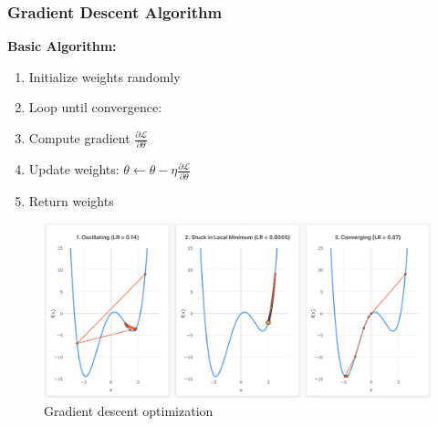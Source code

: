 \documentclass[notes]{beamer}
\begin{document}
\begin{frame}
\frametitle{Gradient Descent Algorithm}

\begin{minipage}[t]{0.45\textwidth}
\textbf{Basic Algorithm:}
\begin{enumerate}
\item Initialize weights randomly
\item Loop until convergence:
\item \quad Compute gradient $\frac{\partial \mathcal{L}}{\partial \theta}$
\item \quad Update weights: $\theta \leftarrow \theta - \eta \frac{\partial \mathcal{L}}{\partial \theta}$
\item Return weights
\end{enumerate}


\end{minipage}
\hfill
\begin{minipage}[t]{0.53\textwidth}
\centering
\begin{figure}[ht]
	\centering
	\includegraphics[width=0.9\linewidth]{figs/sgd.png}
	\caption*{Gradient descent optimization}
\end{figure}
\href{https://kks32-courses.github.io/ut-portugal-sciml/00-mlp/sgd/}{}
\end{minipage}

\end{frame}
\end{document}
